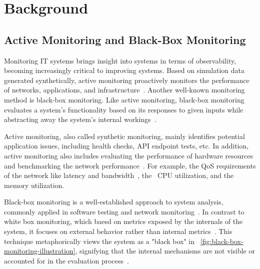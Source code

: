 \usetikzlibrary{positioning,fit,calc,arrows,shapes}

\chapter{Background}\label{chapter:background}

\section{Active Monitoring and Black-Box Monitoring}

Monitoring IT systems brings insight into systems in terms of observability, becoming increasingly critical to improving systems. Based on simulation data generated synthetically, active monitoring proactively monitors the performance of networks, applications, and infrastructure~\parencite{wickramasingheActiveVsPassive2023}. Another well-known monitoring method is black-box monitoring. Like active monitoring, black-box monitoring evaluates a system's functionality based on its responses to given inputs while abstracting away the system's internal workings~\parencite{jorgensenSoftwareTestingCraftsman2021}. 

Active monitoring, also called synthetic monitoring, mainly identifies potential application issues, including health checks, \ac{API} endpoint tests, etc. In addition, active monitoring also includes evaluating the performance of hardware resources and benchmarking the network performance~\parencite{wickramasingheActiveVsPassive2023}. For example, the \ac{QoS} requirements of the network like latency and bandwidth~\parencite{beyerSiteReliabilityEngineering2016}, the ~\ac{CPU} utilization, and the memory utilization. 

Black-box monitoring is a well-established approach to system analysis, commonly applied in software testing and network monitoring~\parencite{marianiChapterFourRecent2015}. In contrast to white box monitoring, which baesd on metrics exposed by the internals of the system, it focuses on external behavior rather than internal metrics~\parencite{beyerSiteReliabilityEngineering2016}. This technique metaphorically views the system as a "black box" in ~\autoref{fig:black-box-monitoring-illustration}, signifying that the internal mechanisms are not visible or accounted for in the evaluation process~\parencite{myersArtSoftwareTesting2004}. 

